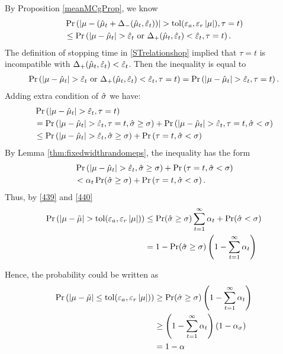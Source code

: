 \documentclass[hyperref={pdfpagelabels=false}]{beamer}
\begin{document}
{By Proposition \ref{meanMCgProp}, we know
\begin{align*}
 &\Pr \left( \left \lvert \mu-(\hat{\mu}_t+\Delta_{-}(\hat{\mu}_t,\hat{\varepsilon}_t)) \right \rvert> \operatorname{tol}(\varepsilon_a,\varepsilon_r\left \lvert \mu \right \rvert), \tau = t  \right)\\
&\leq
\Pr \left( \left \lvert \mu-\hat{\mu}_t \right \rvert>\hat{\varepsilon}_t  \text{ or } \Delta_{+}(\hat{\mu}_t,\hat{\varepsilon}_t)<\hat{\varepsilon}_t , \tau = t \right).
\end{align*}
The definition of stopping time in \eqref{STrelationshop} implied that $\tau = t$ is incompatible with $ \Delta_{+}(\hat{\mu}_t,\hat{\varepsilon}_t)<\hat{\varepsilon}_t$. Then the inequality is equal to
\begin{align*}
\Pr \left( \left \lvert \mu-\hat{\mu}_t \right \rvert> \hat{\varepsilon}_t  \text{ or } \Delta_{+}(\hat{\mu}_t,\hat{\varepsilon}_t)<\hat{\varepsilon}_t , \tau = t\right)= \Pr \left( \left \lvert \mu-\hat{\mu}_t \right \rvert> \hat{\varepsilon}_t, \tau = t \right).
\end{align*}
Adding extra condition of $\hat{\sigma}$ we have:
\begin{align*}
& \Pr \left( \left \lvert \mu-\hat{\mu}_t \right \rvert> \hat{\varepsilon}_t, \tau = t \right) \\
 &=  \Pr \left( \left \lvert \mu-\hat{\mu}_t \right \rvert> \hat{\varepsilon}_t, \tau = t , \hat{\sigma}\geq\sigma\right) + \Pr \left( \left \lvert \mu-\hat{\mu}_t \right \rvert> \hat{\varepsilon}_t, \tau = t,\hat{\sigma}<\sigma \right) \\
 & \leq \Pr \left( \left \lvert \mu-\hat{\mu}_t \right \rvert> \hat{\varepsilon}_t, \hat{\sigma}\geq\sigma\right) + \Pr \left(  \tau = t,\hat{\sigma}<\sigma \right)
\end{align*}
By Lemma \ref{thm:fixedwidthrandomeps}, the inequality has the form
\begin{align}\label{440}
&\Pr \left( \left \lvert \mu-\hat{\mu}_t \right \rvert> \hat{\varepsilon}_t, \hat{\sigma}\geq\sigma\right) + \Pr \left(  \tau = t,\hat{\sigma}<\sigma \right) \nonumber\\
&<\alpha_t \Pr(\hat{\sigma} \geq \sigma) +\Pr \left(  \tau = t,\hat{\sigma}<\sigma \right).
\end{align}
Thus, by \eqref{439} and \eqref{440}
\begin{align*}
\Pr \left( \left \lvert \mu-\tilde{\mu} \right \rvert > \operatorname{tol}(\varepsilon_a,\varepsilon_r\left \lvert \mu \right \rvert)\right) 
&\leq \Pr(\hat{\sigma} \geq \sigma) \sum_{t=1}^\infty \alpha_t+\Pr(\hat{\sigma}<\sigma)\\
&=1-\Pr(\hat{\sigma} \geq \sigma)\left(1-\sum_{t=1}^\infty \alpha_t\right)
\end{align*}

Hence, the probability could be written as
\begin{align*}
\Pr \left( \left \lvert \mu-\tilde{\mu} \right \rvert \leq \operatorname{tol}(\varepsilon_a,\varepsilon_r\left \lvert \mu \right \rvert)\right) &\geq \Pr(\hat{\sigma} \geq \sigma)\left(1-\sum_{t=1}^\infty \alpha_t\right) \\&\geq \left(1-\sum_{t=1}^\infty \alpha_t\right) (1-\alpha_\sigma) \\&= 1-\alpha
\end{align*}
}
\end{document}
